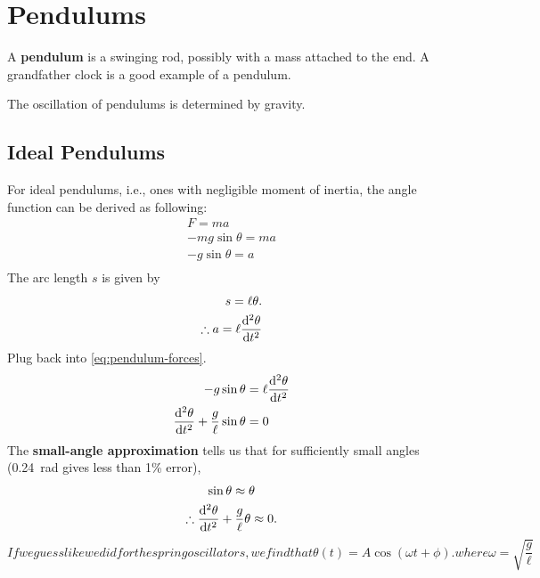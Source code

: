 \section{Pendulums}

A \textbf{pendulum} is a swinging rod,
possibly with a mass attached to the end.
A grandfather clock is a good example of a pendulum.

The oscillation of pendulums is determined by gravity.

\subsection{Ideal Pendulums}

For ideal pendulums, i.e., ones with negligible moment of inertia,
the angle function can be derived as following:
\begin{equation} \label{eq:pendulum-forces}
    \begin{aligned}
        F = m a \\
        - m g \sin\theta = m a \\
        - g \sin\theta = a \\
    \end{aligned}
\end{equation}
The arc length \(s\) is given by
\begin{equation}
    \begin{aligned}
        s = \ell \theta. \\
        \therefore a = \ell \odv[2]{\theta}{t}
    \end{aligned}
\end{equation}
Plug back into \cref{eq:pendulum-forces}.
\begin{equation}
    \begin{aligned}
        - g \sin\theta &= \ell \odv[2]{\theta}{t} \\
        \odv[2]{\theta}{t} + \frac{g}{\ell} \sin\theta &= 0
    \end{aligned}
\end{equation}
The \textbf{small-angle approximation} tells us that for sufficiently
small angles
(\qty{0.24}{\radian} gives less than 1\% error),
\begin{gather}
    \sin\theta \approx \theta \\
    \therefore \odv[2]{\theta}{t} + \frac{g}{\ell} \theta \approx 0.
\end{gather}
\begin{subequations}
    If we guess like we did for the spring oscillators, we find that
    \begin{equation}
        \theta(t) = A \cos(\omega t + \phi).
    \end{equation}
    where
    \begin{equation}
        \omega = \sqrt{\frac{g}{\ell}}
    \end{equation}
\end{subequations}

